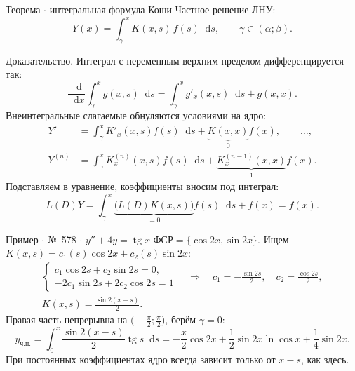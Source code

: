 \documentclass[12pt,a4paper]{article}
\newcommand{\dd}{\mathop{}\!\mathrm{d}}
\begin{document}
\begin{result}{Теорема \(\cdot\) интегральная формула Коши}
Частное решение ЛНУ:
\[
 \boxed{\displaystyle Y(x)=\int_\gamma^x K(x,s)\,f(s)\dd s,\qquad \gamma\in(\alpha;\beta).}
\]
\end{result}

\begin{reasoning}{Доказательство.}
Интеграл с переменным верхним пределом дифференцируется так:
\[
 \frac{\dd}{\dd x}\int_\gamma^x g(x,s)\dd s=\int_\gamma^x g'_x(x,s)\dd s+g(x,x).
\]
Внеинтегральные слагаемые обнуляются условиями на ядро:
\[
 \begin{aligned}
 Y'&=\int_\gamma^x K'_x(x,s)f(s)\dd s+\underbrace{K(x,x)}_{0}f(x),\qquad\ldots,\\
 Y^{(n)}&=\int_\gamma^x K_x^{(n)}(x,s)f(s)\dd s+\underbrace{K_x^{(n-1)}(x,x)}_{1}f(x).
 \end{aligned}
\]
Подставляем в уравнение, коэффициенты вносим под интеграл:
\[
 L(D)Y=\int_\gamma^x\underbrace{\bigl(L(D)K(x,s)\bigr)}_{=0}f(s)\dd s+f(x)=f(x).
\]
\end{reasoning}

\begin{example}{Пример \(\cdot\) №~578 \(\cdot\) \(y''+4y=\operatorname{tg}x\)}
\(\text{ФСР}=\{\cos2x,\sin2x\}\). Ищем \(K(x,s)=c_1(s)\cos2x+c_2(s)\sin2x\):
\[
 \begin{gathered}
 \begin{cases}
 c_1\cos2s+c_2\sin2s=0,\\
 -2c_1\sin2s+2c_2\cos2s=1
 \end{cases}
 \quad\Rightarrow\quad c_1=-\frac{\sin2s}{2},\quad c_2=\frac{\cos2s}{2},\\
 K(x,s)=\frac{\sin2(x-s)}{2}.
 \end{gathered}
\]
Правая часть непрерывна на \(\bigl(-\frac{\pi}{2};\frac{\pi}{2}\bigr)\), берём \(\gamma=0\):
\[
 y_{\text{ч.н.}}=\int_0^x\frac{\sin2(x-s)}{2}\operatorname{tg}s\dd s
 =-\frac{x}{2}\cos2x+\frac12\sin2x\ln\cos x+\frac14\sin2x.
\]
При постоянных коэффициентах ядро всегда зависит только от \(x-s\), как здесь.
\end{example}
\end{document}
